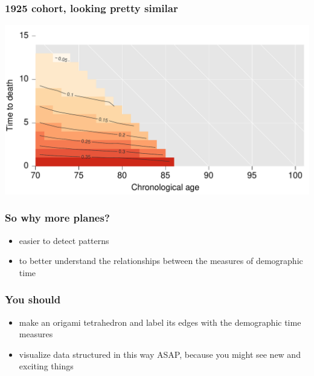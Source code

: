 \documentclass[20pt]{beamer}
\begin{document}
\begin{frame}
\frametitle{1925 cohort, looking pretty similar}
\vspace{-4em}
\begin{center}
\includegraphics[scale=1]{Figures/srhpoor1925.pdf}
\end{center}
\end{frame}


\begin{frame}
\frametitle{So why more planes?}
\normalsize
\begin{itemize}[<+->]
  \item easier to detect patterns
  \item to better understand the relationships between the measures of
  demographic time
\end{itemize}
\end{frame}


\begin{frame}
\frametitle{You should}
\normalsize
\begin{itemize}[<+->]
  \item make an origami tetrahedron and label its edges with the demographic
  time measures
  \item visualize data structured in this way ASAP, because you might see new
  and exciting things
\end{itemize}
\end{frame}

\end{document}
